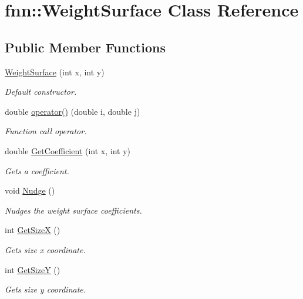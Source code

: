 \hypertarget{classfnn_1_1_weight_surface}{}\section{fnn\+:\+:Weight\+Surface Class Reference}
\label{classfnn_1_1_weight_surface}
\subsection*{Public Member Functions}
\begin{DoxyCompactItemize}
\item 
\hyperlink{classfnn_1_1_weight_surface_a4921176aab594a3d2790ce3104fb5a1c}{Weight\+Surface} (int x, int y)
\begin{DoxyCompactList}\small\item\em Default constructor. \end{DoxyCompactList}\item 
double \hyperlink{classfnn_1_1_weight_surface_a5bb5ed8594a90294dc60c4b1c52fca46}{operator()} (double i, double j)
\begin{DoxyCompactList}\small\item\em Function call operator. \end{DoxyCompactList}\item 
double \hyperlink{classfnn_1_1_weight_surface_a2793e7904c1e6abfdc9d10b6099d99c1}{Get\+Coefficient} (int x, int y)
\begin{DoxyCompactList}\small\item\em Gets a coefficient. \end{DoxyCompactList}\item 
void \hyperlink{classfnn_1_1_weight_surface_a752fec9b16806cdfad2925bd7e5a5f17}{Nudge} ()
\begin{DoxyCompactList}\small\item\em Nudges the weight surface coefficients. \end{DoxyCompactList}\item 
int \hyperlink{classfnn_1_1_weight_surface_a4900e44ce6511da1e58a34fa67143810}{Get\+Size\+X} ()
\begin{DoxyCompactList}\small\item\em Gets size x coordinate. \end{DoxyCompactList}\item 
int \hyperlink{classfnn_1_1_weight_surface_ade93fe2cb3ddd6b0f4fe271e5e38eb0b}{Get\+Size\+Y} ()
\begin{DoxyCompactList}\small\item\em Gets size y coordinate. \end{DoxyCompactList}\end{DoxyCompactItemize}


